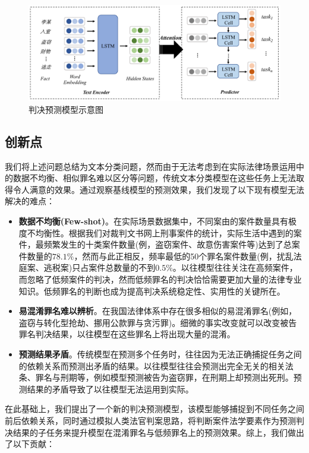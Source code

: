 \begin{figure}[ht]
    \centering
    \includegraphics[width=\linewidth]{figures/model1}
    \caption{判决预测模型示意图}
    \label{fig:model1}
\end{figure}

\subsection{创新点}
我们将上述问题总结为文本分类问题，然而由于无法考虑到在实际法律场景运用中的数据不均衡、相似罪名难以区分等问题，传统文本分类模型在这些任务上无法取得令人满意的效果。通过观察基线模型的预测效果，我们发现了以下现有模型无法解决的难点：
\begin{itemize}
	\item \textbf{数据不均衡(Few-shot)}。在实际场景数据集中，不同案由的案件数量具有极度不均衡性。根据我们对裁判文书网上刑事案件的统计，实际生活中遇到的案件，最频繁发生的十类案件数量(例，盗窃案件、故意伤害案件等)达到了总案件数量的$78.1\%$，然而与此正相反，频率最低的50个罪名案件数量(例，扰乱法庭案、逃税案)只占案件总数量的不到$0.5\%$。以往模型往往关注在高频案件，而忽略了低频案件的判决，然而低频罪名的判决恰恰需要更加大量的法律专业知识。低频罪名的判断也成为提高判决系统稳定性、实用性的关键所在。
	\item \textbf{易混淆罪名难以辨析}。在我国法律体系中存在很多相似的易混淆罪名(例如，盗窃与转化型抢劫、挪用公款罪与贪污罪)。细微的事实改变就可以改变被告罪名判决结果，以往模型在这些罪名上将出现大量的混淆。
	\item \textbf{预测结果矛盾}。传统模型在预测多个任务时，往往因为无法正确捕捉任务之间的依赖关系而预测出矛盾的结果。以往模型往往会预测出完全无关的相关法条、罪名与刑期等，例如模型预测被告为盗窃罪，在刑期上却预测出死刑。预测结果的矛盾导致了以往模型无法运用到实际。
\end{itemize}

在此基础上，我们提出了一个新的判决预测模型，该模型能够捕捉到不同任务之间前后依赖关系，同时通过模拟人类法官判案思路，将判断案件法学要素作为预测判决结果的子任务来提升模型在混淆罪名与低频罪名上的预测效果。综上，我们做出了以下贡献：

